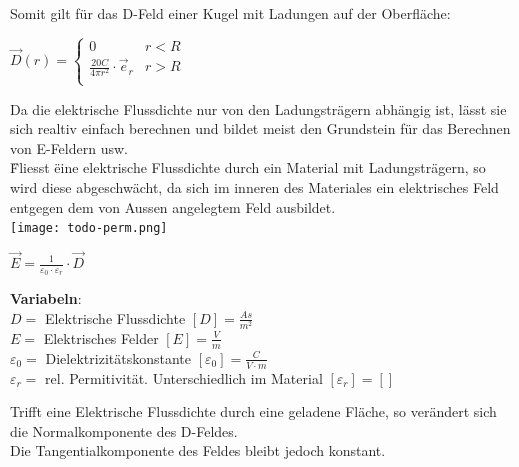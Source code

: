 					Somit gilt für das D-Feld einer Kugel mit Ladungen auf der Oberfläche: \\
\begin{center}

					$
					\vec{D}(r) =
					\begin{cases}
      0 & r < R \\
      \frac{20 C}{4 \pi r^2} \cdot  \vec{e}_r & r > R \\
   \end{cases}$

	 \end{center}
					\iend


					Da die elektrische Flussdichte nur von den Ladungsträgern abhängig ist, lässt sie sich realtiv einfach berechnen und bildet meist den Grundstein für
					das Berechnen von E-Feldern usw. \\
					\" Fliesst \" eine elektrische Flussdichte durch ein Material mit Ladungsträgern, so wird diese abgeschwächt, da sich im inneren des Materiales ein
					elektrisches Feld entgegen dem von Aussen angelegtem Feld ausbildet. \\
					\texttt{[image: todo-perm.png]}

					\begingl
					\begin{center}
						\formulaBegin
						$ \vec{E} = \frac{1}{\varepsilon_0 \cdot \varepsilon_r} \cdot \vec{D}$
						\formulaEnd
					\end{center}
					\textbf{Variabeln}: \\
					$D = $ Elektrische Flussdichte $ [D] = \frac{As}{m^2}$ \\
					$ E = $ Elektrisches Felder $[E] = \frac{V}{m}$ \\
					$ \varepsilon_0 = $ Dielektrizitätskonstante $ [\varepsilon_0] = \frac{C}{V\cdot m}$ \\
					$ \varepsilon_r = $ rel. Permitivität. Unterschiedlich im Material $ [\varepsilon_r] = [ ]$ \\

					\iend



					\beginip
					Trifft eine Elektrische Flussdichte durch eine geladene Fläche, so verändert sich die Normalkomponente des D-Feldes. \\
					Die Tangentialkomponente des Feldes bleibt jedoch konstant. \\

